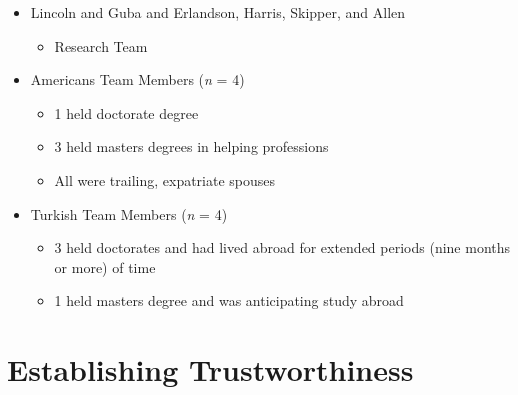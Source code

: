\documentclass[
  english,
]{book}
\providecommand{\tightlist}{%
  \setlength{\itemsep}{0pt}\setlength{\parskip}{0pt}}
\begin{document}
\begin{itemize}
\tightlist
\item
  Lincoln and Guba \citeyearpar{lincoln_naturalistic_1985} and Erlandson, Harris, Skipper, and Allen \citeyearpar{erlandson_doing_1993}

  \begin{itemize}
  \tightlist
  \item
    Research Team
  \end{itemize}
\item
  Americans Team Members (\emph{n} = 4)

  \begin{itemize}
  \tightlist
  \item
    1 held doctorate degree
  \item
    3 held masters degrees in helping professions
  \item
    All were trailing, expatriate spouses
  \end{itemize}
\item
  Turkish Team Members (\emph{n} = 4)

  \begin{itemize}
  \tightlist
  \item
    3 held doctorates and had lived abroad for extended periods (nine months or more) of time
  \item
    1 held masters degree and was anticipating study abroad
  \end{itemize}
\end{itemize}

\hypertarget{establishing-trustworthiness}{%
\section{Establishing Trustworthiness}\label{establishing-trustworthiness}}
\end{document}
